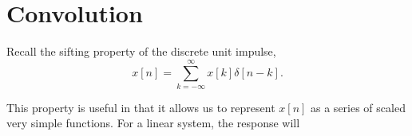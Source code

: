 \section{Convolution}

Recall the sifting property of the discrete unit impulse,
\begin{equation}
    x[n] = \sum_{k=-\infty}^{\infty} x[k] \delta[n - k].
\end{equation}

This property is useful in that it allows us to represent
$x[n]$ as a series of scaled very simple functions. For a
linear system, the response will